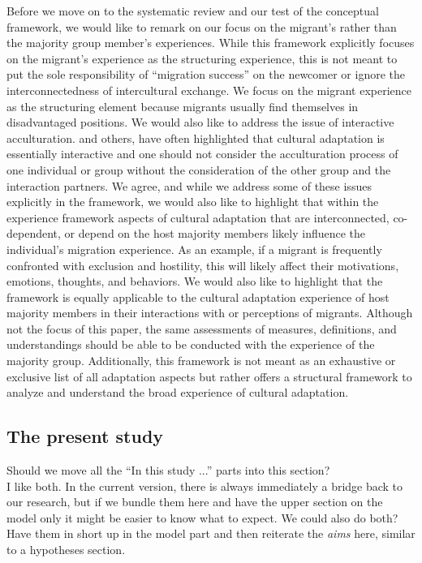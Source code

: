\documentclass[man, 12pt, a4paper]{apa7}
\newcommand\Warning[1][2ex]{%
  \renewcommand\stacktype{L}%
  \scaleto{\stackon[1.3pt]{\color{red}$\triangle$}{\tiny\bfseries !}}{#1}}%
\begin{document}
Before we move on to the systematic review and our test of the conceptual framework, we would like to remark on our focus on the migrant's rather than the majority group member's experiences. 
While this framework explicitly focuses on the migrant's experience as the structuring experience, this is not meant to put the sole responsibility of ``migration success'' on the newcomer or ignore the interconnectedness of intercultural exchange. We focus on the migrant experience as the structuring element because migrants usually find themselves in disadvantaged positions. 
We would also like to address the issue of interactive acculturation. \citet{Bourhis1997a} and others, have often highlighted that cultural adaptation is essentially interactive and one should not consider the acculturation process of one individual or group without the consideration of the other group and the interaction partners. We agree, and while we address some of these issues explicitly in the framework, we would also like to highlight that within the experience framework aspects of cultural adaptation that are interconnected, co-dependent, or depend on the host majority members likely influence the individual's migration experience. As an example, if a migrant is frequently confronted with exclusion and hostility, this will likely affect their motivations, emotions, thoughts, and behaviors. 
We would also like to highlight that the framework is equally applicable to the cultural adaptation experience of host majority members in their interactions with or perceptions of migrants. Although not the focus of this paper, the same assessments of measures, definitions, and understandings should be able to be conducted with the experience of the majority group.
Additionally, this framework is not meant as an exhaustive or exclusive list of all adaptation aspects but rather offers a structural framework to analyze and understand the broad experience of cultural adaptation.

\subsection{The present study}

\Warning Should we move all the ``In this study ...'' parts into this section? \\
\noindent I like both. In the current version, there is always immediately a bridge back to our research, but if we bundle them here and have the upper section on the model only it might be easier to know what to expect. We could also do both? Have them in short up in the model part and then reiterate the \textit{aims} here, similar to a hypotheses section.
\end{document}
